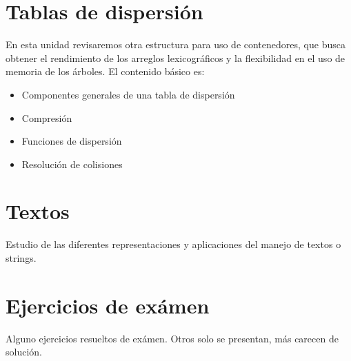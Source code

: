 \documentclass[10pt,letterpaper,]{book}
\begin{document}
\chapter{Tablas de dispersión}

En esta unidad revisaremos otra estructura para uso de contenedores,
que busca obtener el rendimiento de los arreglos lexicográficos y
la flexibilidad en el uso de memoria de los árboles. El contenido
básico es:

  \begin{itemize}
  \item Componentes generales de una tabla de dispersión
  \item Compresión
  \item Funciones de dispersión
  \item Resolución de colisiones
  \end{itemize}



\chapter{Textos}
\label{cha:textos}
Estudio de las diferentes representaciones y aplicaciones del manejo
de textos o strings.



\chapter{Ejercicios de exámen}
Alguno ejercicios resueltos de exámen. Otros solo se presentan, más
carecen de solución.

\end{document}
